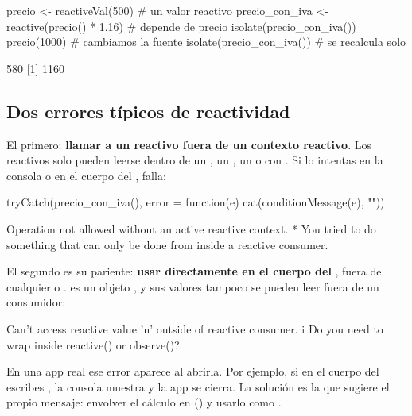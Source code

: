 \begin{rcode}
precio <- reactiveVal(500)                   # un valor reactivo
precio_con_iva <- reactive(precio() * 1.16)  # depende de precio
isolate(precio_con_iva())
precio(1000)                                 # cambiamos la fuente
isolate(precio_con_iva())                    # se recalcula solo
\end{rcode}
\begin{rsalida}
[1] 580
[1] 1160
\end{rsalida}

\subsection{Dos errores típicos de reactividad}
\label{sec:m6-errores-reactivos}

El primero: \textbf{llamar a un reactivo fuera de un contexto reactivo}.
Los reactivos solo pueden leerse dentro de un , un
, un  o con . Si lo
intentas en la consola o en el cuerpo del , falla:

\begin{rcode}
tryCatch(precio_con_iva(),
         error = function(e) cat(conditionMessage(e), "\n"))
\end{rcode}
\begin{rsalida}
Operation not allowed without an active reactive context.
* You tried to do something that can only be done from inside a reactive consumer. 
\end{rsalida}

El segundo es su pariente: \textbf{usar  directamente en
el cuerpo del }, fuera de cualquier  o
.  es un objeto , y
sus valores tampoco se pueden leer fuera de un consumidor:

\begin{rsalida}
Can't access reactive value 'n' outside of reactive consumer.
i Do you need to wrap inside reactive() or observe()? 
\end{rsalida}

En una app real ese error aparece al abrirla. Por ejemplo, si en el cuerpo
del  escribes , la consola
muestra
 y la app se cierra. La solución es la que sugiere el propio
mensaje: envolver el cálculo en  () y usarlo como .

